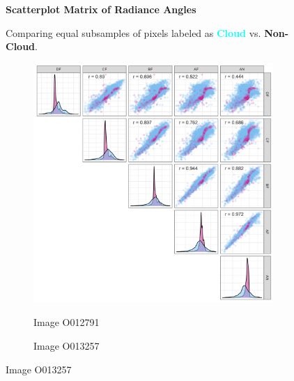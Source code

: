 \documentclass[10pt,letterpaper]{article}
\begin{document}
\begin{figure}[ht]
    \centering

    \parbox{\textwidth}{\centering 
        \fontsize{13pt}{13pt}\selectfont \textbf{Scatterplot Matrix of Radiance Angles}  
        
        {\fontsize{11pt}{13pt}\selectfont Comparing equal subsamples of pixels labeled as \textcolor{Cyan}{\textbf{Cloud}} vs. \textcolor{RedViolet}{\textbf{Non-Cloud}}.} 
    }
    
    \begin{subfigure}[t]{0.3\textwidth}
        \centering
        \caption{Image O012791}
        \includegraphics[width=\textwidth]{figs/corr1_void.png}
        \label{subfig:corr1}
    \end{subfigure}
    \hfill
    \begin{subfigure}[t]{0.3\textwidth}
        \centering
        \caption{Image O013257}

\end{subfigure}
\end{figure}
\end{document}
